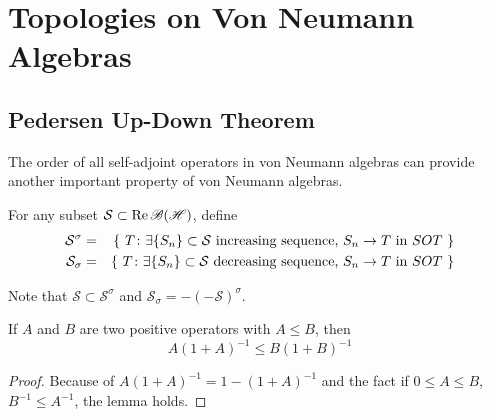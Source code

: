 \section{Topologies on Von Neumann Algebras}

\subsection{Pedersen Up-Down Theorem}

The order of all self-adjoint operators in von Neumann algebras can provide another important property of von Neumann algebras.

\begin{defn}
	For any subset $\mathcal{S} \subset \operatorname{Re}{\mathscr{B(H)}}$, define
	\begin{eqnarray*}
		\mathcal{S}^{\sigma} &=& \{~T \colon \exists \{S_n\} \subset \mathcal{S}  \text{  increasing sequence, } S_n \rightarrow T \text{ in } SOT~\} \\
		\mathcal{S}_{\sigma} &=& \{~T \colon \exists \{S_n\} \subset \mathcal{S}  \text{  decreasing sequence, } S_n \rightarrow T \text{ in } SOT~\}
	\end{eqnarray*}
\end{defn}
\begin{rem}
	Note that $\mathcal{S}  \subset \mathcal{S}^{\sigma}$ and $\mathcal{S}_{\sigma} = -(-\mathcal{S})^{\sigma}$.
\end{rem}

\begin{lem}
	If $A$ and $B$ are two positive operators with $A  \leqslant B$, then
	\begin{equation*}
		A(1+A)^{-1} \leqslant B(1+B)^{-1}
	\end{equation*}
\end{lem}
\begin{proof}
	Because of $A(1+A)^{-1} = 1  - (1+A)^{-1}$ and the fact if $0 \leqslant A \leqslant B$, $B^{-1} \leqslant A^{-1}$, the lemma holds.
\end{proof}

